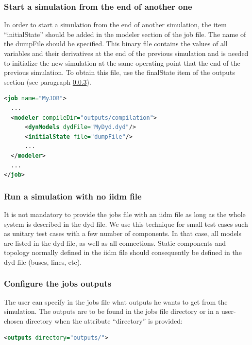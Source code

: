 \documentclass[a4paper, 12pt]{report}
\begin{document}
\subsubsection{Start a simulation from the end of another one}

In order to start a simulation from the end of another simulation, the item ``initialState'' should be added in the modeler section of the job file. The name of the dumpFile should be specified. This binary file contains the values of all variables and their derivatives at the end of the previous simulation and is needed to initialize the new simulation at the same operating point that the end of the previous simulation. To obtain this file, use the finalState item of the outputs section (see paragraph \ref{sec:Configure the jobs outputs}).

\begin{lstlisting}[language=XML, morekeywords={initialState}]
<job name="MyJOB">
  ...
  <modeler compileDir="outputs/compilation">
      <dynModels dydFile="MyDyd.dyd"/>
      <initialState file="dumpFile"/>
      ...
  </modeler>
  ...
</job>
\end{lstlisting}

\subsubsection{Run a simulation with no iidm file}
\label{sec:Run a simulation with no iidm file}

It is not mandatory to provide the jobs file with an iidm file as long as the whole system is described in the dyd file. We use this technique for small test cases such as unitary test cases with a few number of components. In that case, all models are listed in the dyd file, as well as all connections. Static components and topology normally defined in the iidm file should consequently be defined in the dyd file (buses, lines, etc).

\subsubsection{Configure the jobs outputs}
\label{sec:Configure the jobs outputs}

The user can specify in the jobs file what outputs he wants to get from the simulation. The outputs are to be found in the jobs file directory or in a user-chosen directory when the attribute ``directory'' is provided:

\begin{lstlisting}[language=XML,numbers=none]
<outputs directory="outputs/">
\end{lstlisting}
\end{document}
